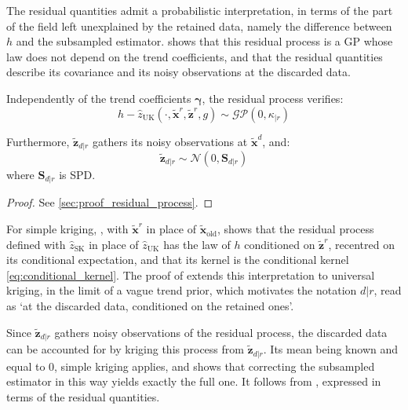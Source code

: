 The residual quantities admit a probabilistic interpretation, in terms of the part of the field left unexplained by the retained data, namely the difference between $h$ and the subsampled estimator.  shows that this residual process is a GP whose law does not depend on the trend coefficients, and that the residual quantities describe its covariance and its noisy observations at the discarded data.

\begin{proposition}\label{th:residual_process}
	Independently of the trend coefficients $\boldsymbol{\gamma}$, the residual process verifies:
	\begin{equation}
		h-\hat{z}_{\mathrm{UK}}(\cdot,\tilde{\mathbf{x}}^r,\tilde{\mathbf{z}}^r,g)\sim\mathcal{GP}(0,\kappa_{|r})
	\end{equation}

	Furthermore, $\tilde{\mathbf{z}}_{d|r}$ gathers its noisy observations at $\tilde{\mathbf{x}}^d$, and:
	\begin{equation}
		\tilde{\mathbf{z}}_{d|r}\sim\mathcal{N}\left(0,\mathbf{S}_{d|r}\right)
	\end{equation}
	where $\mathbf{S}_{d|r}$ is SPD.
\end{proposition}

\begin{proof}
	See \cref{sec:proof_residual_process}.
\end{proof}

For simple kriging, , with $\tilde{\mathbf{x}}^r$ in place of $\tilde{\mathbf{x}}_{\mathrm{old}}$, shows that the residual process defined with $\hat{z}_{\mathrm{SK}}$ in place of $\hat{z}_{\mathrm{UK}}$ has the law of $h$ conditioned on $\tilde{\mathbf{z}}^r$, recentred on its conditional expectation, and that its kernel is the conditional kernel \eqref{eq:conditional_kernel}. The proof of  extends this interpretation to universal kriging, in the limit of a vague trend prior, which motivates the notation $d|r$, read as `at the discarded data, conditioned on the retained ones'.

Since $\tilde{\mathbf{z}}_{d|r}$ gathers noisy observations of the residual process, the discarded data can be accounted for by kriging this process from $\tilde{\mathbf{z}}_{d|r}$. Its mean being known and equal to $0$, simple kriging applies, and  shows that correcting the subsampled estimator in this way yields exactly the full one. It follows from , expressed in terms of the residual quantities.

